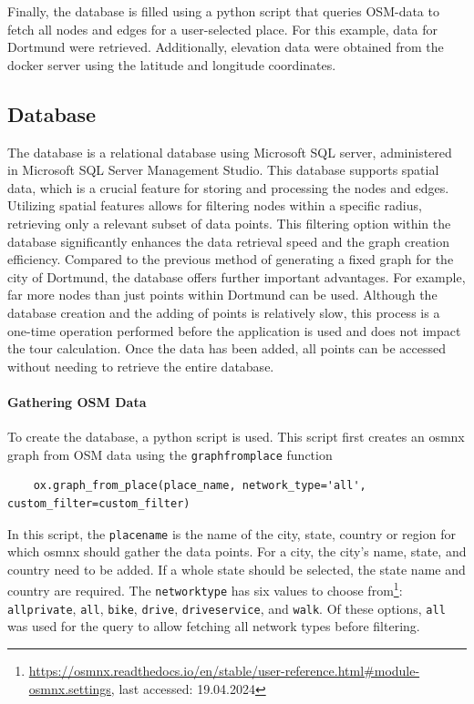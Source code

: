 Finally, the database is filled using a python script that queries OSM-data to fetch all nodes and edges for a user-selected place.
For this example, data for Dortmund were retrieved.
Additionally, elevation data were obtained from the docker server using the latitude and longitude coordinates.



\subsection{Database}
\label{subsection:database}

The database is a relational database using Microsoft SQL server, administered in Microsoft SQL Server Management Studio.
This database supports spatial data, which is a crucial feature for storing and processing the nodes and edges.
Utilizing spatial features allows for filtering nodes within a specific radius, retrieving only a relevant subset of data points.
This filtering option within the database significantly enhances the data retrieval speed and the graph creation efficiency.
Compared to the previous method of generating a fixed graph for the city of Dortmund, the database offers further important advantages.
For example, far more nodes than just points within Dortmund can be used.
Although the database creation and the adding of points is relatively slow, this process is a one-time operation performed before the application is used and does not impact the tour calculation. 
Once the data has been added, all points can be accessed without needing to retrieve the entire database.

\paragraph{Gathering OSM Data}

To create the database, a python script is used. 
This script first creates an osmnx graph from OSM data using the \texttt{graph\textunderscore from\textunderscore place} function
\begin{lstlisting}
	ox.graph_from_place(place_name, network_type='all', custom_filter=custom_filter)
\end{lstlisting}

In this script, the \texttt{place\textunderscore name} is the name of the city, state, country or region for which osmnx should gather the data points.
For a city, the city's name, state, and country need to be added. 
If a whole state should be selected, the state name and country are required.
The \texttt{network\textunderscore type} has six values to choose from\footnote{\url{https://osmnx.readthedocs.io/en/stable/user-reference.html\#module-osmnx.settings}, last accessed: 19.04.2024}: \texttt{all\textunderscore private}, \texttt{all}, \texttt{bike}, \texttt{drive}, \texttt{drive\textunderscore service}, and \texttt{walk}. 
Of these options, \texttt{all} was used for the query to allow fetching all network types before filtering.

